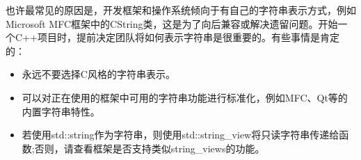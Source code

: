 也许最常见的原因是，开发框架和操作系统倾向于有自己的字符串表示方式，例如Microsoft MFC框架中的CString类，这是为了向后兼容或解决遗留问题。开始一个C++项目时，提前决定团队将如何表示字符串是很重要的。有些事情是肯定的：

\begin{itemize}
\item
永远不要选择C风格的字符串表示。

\item
可以对正在使用的框架中可用的字符串功能进行标准化，例如MFC、Qt等的内置字符串特性。

\item
若使用std::string作为字符串，则使用std::string\_view将只读字符串传递给函数;否则，请查看框架是否支持类似string\_views的功能。
\end{itemize}




























